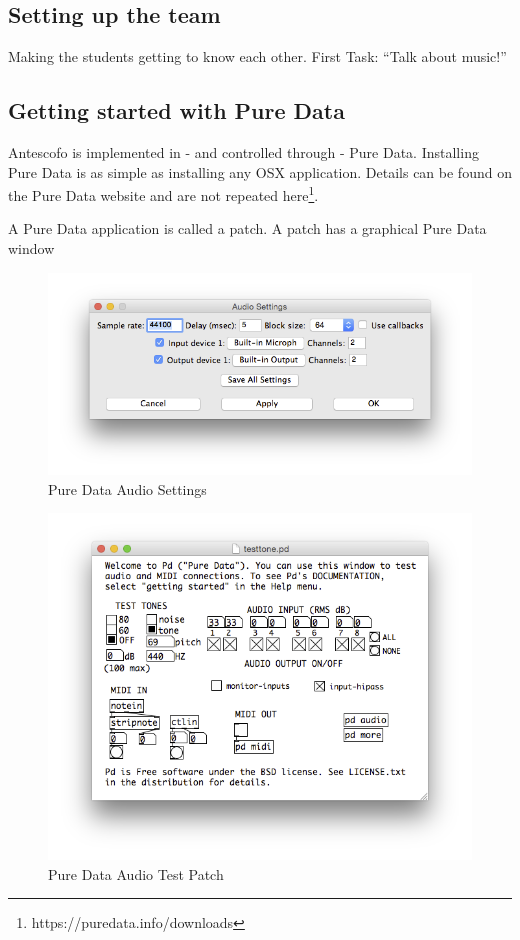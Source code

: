 \documentclass[onecolumn,nocopyrightspace,preprint]{sigplanconf}
\begin{document}
\subsection{Setting up the team}

Making the students getting to know each other. First Task: ``Talk about music!''

\subsection{Getting started with Pure Data}


Antescofo is implemented in - and controlled through - Pure Data.
Installing Pure Data is as simple as installing any OSX application. Details can be found
on the Pure Data website and are not repeated here\footnote{https://puredata.info/downloads}.

A Pure Data application is called a patch. A patch has a graphical Pure Data window



\begin{figure}[ht]
    \centering
    \includegraphics[scale=0.4]{fig/pd-audio.png}
    \caption{Pure Data Audio Settings}
    \label{fig:pd-audio}
\end{figure}


\begin{figure}[ht]
    \centering
    \includegraphics[scale=0.4]{fig/pd-test.png}
    \caption{Pure Data Audio Test Patch}
    \label{fig:pd-test}
\end{figure}
\end{document}
